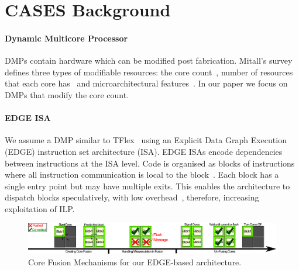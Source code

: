 \section{CASES Background}

\paragraph{Dynamic Multicore Processor} DMPs contain hardware which can be modified post fabrication.
Mitall's survey ~\cite{MittalSurv2016} defines three types of modifiable resources: the core count~\cite{ipek2007CoreFusion}, number of resources that each core has~\cite{Homayoun3DPooling2012} and microarchitectural features~\cite{fallinhetblock2014,BauerRSE08,tavanaElastic}.
In our paper we focus on DMPs that modify the core count.

\paragraph{EDGE ISA} We assume a DMP similar to TFlex~\cite{kim2007tflex} using an Explicit Data Graph Execution~\cite{burger04edge} (EDGE) instruction set architecture (ISA).
EDGE ISAs encode dependencies between instructions at the ISA level.
Code is organised as blocks of instructions where all instruction communication is local to the block~\cite{smith2006edge}.
Each block has a single entry point but may have multiple exits.
This enables the architecture to dispatch blocks speculatively, with low overhead~\cite{putnam2010e2,kim2007tflex}, therefore, increasing exploitation of ILP.

 \begin{figure}[t]
 \center
 \includegraphics[width=1\textwidth]{cases-paper/graphics/background/proc_test.pdf}
\vspace*{-5mm}
 \caption{Core Fusion Mechanisms for our EDGE-based architecture.}\label{fig:dmp}
\vspace{-5mm}
 \end{figure}
